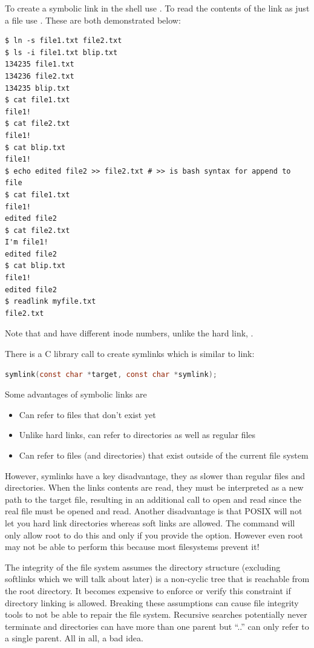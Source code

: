 To create a symbolic link in the shell use . To read the contents of the link as just a file use . These are both demonstrated below:

\begin{verbatim}
$ ln -s file1.txt file2.txt
$ ls -i file1.txt blip.txt
134235 file1.txt
134236 file2.txt
134235 blip.txt
$ cat file1.txt
file1!
$ cat file2.txt
file1!
$ cat blip.txt
file1!
$ echo edited file2 >> file2.txt # >> is bash syntax for append to file
$ cat file1.txt
file1!
edited file2
$ cat file2.txt
I'm file1!
edited file2
$ cat blip.txt
file1!
edited file2
$ readlink myfile.txt
file2.txt
\end{verbatim}

Note that  and  have different inode numbers, unlike the hard link, .

There is a C library call to create symlinks which is similar to link:

\begin{lstlisting}[language=C]
symlink(const char *target, const char *symlink);
\end{lstlisting}

Some advantages of symbolic links are

\begin{itemize}
\tightlist
\item
  Can refer to files that don't exist yet
\item
  Unlike hard links, can refer to directories as well as regular files
\item
  Can refer to files (and directories) that exist outside of the current file system
\end{itemize}

However, symlinks have a key disadvantage, they as slower than regular files and directories. When the links contents are read, they must be interpreted as a new path to the target file, resulting in an additional call to open and read since the real file must be opened and read. Another disadvantage is that POSIX will not let you hard link directories whereas soft links are allowed. The  command will only allow root to do this and only if you provide the  option. However even root may not be able to perform this because most filesystems prevent it!

The integrity of the file system assumes the directory structure (excluding softlinks which we will talk about later) is a non-cyclic tree that is reachable from the root directory. It becomes expensive to enforce or verify this constraint if directory linking is allowed. Breaking these assumptions can cause file integrity tools to not be able to repair the file system. Recursive searches potentially never terminate and directories can have more than one parent but ``..'' can only refer to a single parent. All in all, a bad idea.

